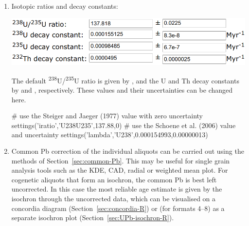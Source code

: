 \begin{refsection}
\begin{enumerate}
  \item\label{it:UPbLambdairatio} Isotopic ratios and decay constants:

\noindent\begin{minipage}[t]{.55\linewidth}
\strut\vspace*{-\baselineskip}\newline
\includegraphics[width=\linewidth]{../figures/UPbLambda.png}
\end{minipage}
\begin{minipage}[t]{.45\linewidth}
  The default \textsuperscript{238}U/\textsuperscript{235}U ratio is
  given by \citet{hiess2012}, and the U and Th decay constants by
  \citet{jaffey1971} and \citet{leroux1963}, respectively. These
  values and their uncertainties can be changed here.
\end{minipage}

\begin{script}
# use the Steiger and Jaeger (1977) value with zero uncertainty
settings('iratio','U238U235',137.88,0)
# use the Schoene et al. (2006) value and uncertainty
settings('lambda','U238',0.000154993,0.00000013) 
\end{script}

\item\label{it:common-Pb-concordia} Common Pb correction of the
  individual aliquots can be carried out using the methods of
  Section~\ref{sec:common-Pb}. This may be useful for single grain
  analysis tools such as the KDE, CAD, radial or weighted mean
  plot. For cogenetic aliquots that form an isochron, the common Pb is
  best left uncorrected. In this case the most reliable age estimate
  is given by the isochron through the uncorrected data, which can be
  visualised on a concordia diagram (Section~\ref{sec:concordia-R}) or
  (for formats 4--8) as a separate isochron plot
  (Section~\ref{sec:UPb-isochron-R}).


\end{enumerate}
\end{refsection}
